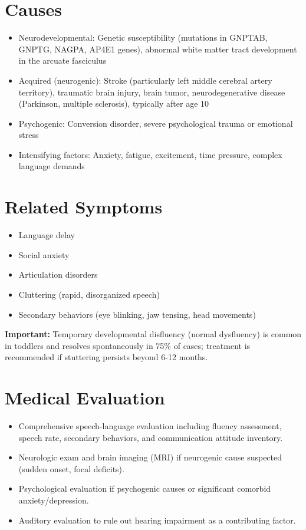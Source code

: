 \section*{Causes}
\begin{itemize}
  \item Neurodevelopmental: Genetic susceptibility (mutations in GNPTAB, GNPTG, NAGPA, AP4E1 genes), abnormal white matter tract development in the arcuate fasciculus
  \item Acquired (neurogenic): Stroke (particularly left middle cerebral artery territory), traumatic brain injury, brain tumor, neurodegenerative disease (Parkinson, multiple sclerosis), typically after age 10
  \item Psychogenic: Conversion disorder, severe psychological trauma or emotional stress
  \item Intensifying factors: Anxiety, fatigue, excitement, time pressure, complex language demands
\end{itemize}

\section*{Related Symptoms}
\begin{itemize}
  \item Language delay
  \item Social anxiety
  \item Articulation disorders
  \item Cluttering (rapid, disorganized speech)
  \item Secondary behaviors (eye blinking, jaw tensing, head movements)
\end{itemize}
\textbf{Important:} Temporary developmental disfluency (normal dysfluency) is common in toddlers and resolves spontaneously in 75\% of cases; treatment is recommended if stuttering persists beyond 6-12 months.

\section*{Medical Evaluation}
\begin{itemize}
  \item Comprehensive speech-language evaluation including fluency assessment, speech rate, secondary behaviors, and communication attitude inventory.
  \item Neurologic exam and brain imaging (MRI) if neurogenic cause suspected (sudden onset, focal deficits).
  \item Psychological evaluation if psychogenic causes or significant comorbid anxiety/depression.
  \item Auditory evaluation to rule out hearing impairment as a contributing factor.
\end{itemize}

